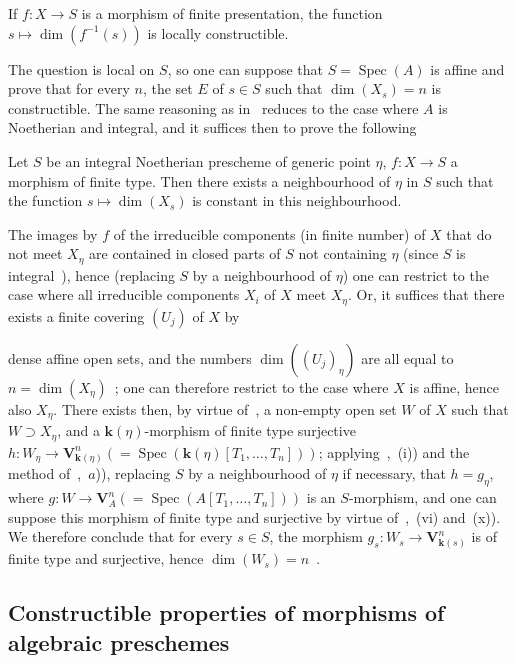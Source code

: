 \begin{proposition}[9.2.6.1]
\label{IV.9.2.6.1}
If $f:X\to S$ is a morphism of finite presentation, the function $s\mapsto\dim(f^{-1}(s))$ is locally constructible.
\end{proposition}

The question is local on $S$, so one can suppose that $S=\operatorname{Spec}(A)$ is affine and prove that for every $n$, the set $E$ of $s\in S$ such that $\dim(X_s)=n$ is constructible.
The same reasoning as in~ reduces to the case where $A$ is Noetherian and integral, and it suffices then to prove the following

\begin{corollary}[9.2.6.2]
\label{IV.9.2.6.2}
Let $S$ be an integral Noetherian prescheme of generic point $\eta$, $f:X\to S$ a morphism of finite type.
Then there exists a neighbourhood of $\eta$ in $S$ such that the function $s\mapsto\dim(X_s)$ is constant in this neighbourhood.
\end{corollary}

The images by $f$ of the irreducible components (in finite number) of $X$ that do not meet $X_\eta$ are contained in closed parts of $S$ not containing $\eta$ (since $S$ is integral~), hence (replacing $S$ by a neighbourhood of $\eta$) one can restrict to the case where all irreducible components $X_i$ of $X$ meet $X_\eta$.
Or, it suffices that there exists a finite covering $(U_j)$ of $X$ by

dense affine open sets, and the numbers $\dim((U_j)_\eta)$ are all equal to $n=\dim(X_\eta)$~; one can therefore restrict to the case where $X$ is affine, hence also $X_\eta$.
There exists then, by virtue of~, a non-empty open set $W$ of $X$ such that $W\supset X_\eta$, and a $\mathbf{k}(\eta)$-morphism of finite type surjective $h:W_\eta\to\mathbf{V}_{\mathbf{k}(\eta)}^n(=\operatorname{Spec}(\mathbf{k}(\eta)[T_1,\ldots,T_n]))$; applying~,~(i)) and the method of~,~$a$)), replacing $S$ by a neighbourhood of $\eta$ if necessary, that $h=g_\eta$, where $g:W\to\mathbf{V}_A^n(=\operatorname{Spec}(A[T_1,\ldots,T_n]))$ is an $S$-morphism, and one can suppose this morphism of finite type and surjective by virtue of~,~(vi) and~(x)).
We therefore conclude that for every $s\in S$, the morphism $g_s:W_s\to\mathbf{V}_{\mathbf{k}(s)}^n$ is of finite type and surjective, hence $\dim(W_s)=n$~.

\subsection{Constructible properties of morphisms of algebraic preschemes}
\label{subsection:IV.9.3}

